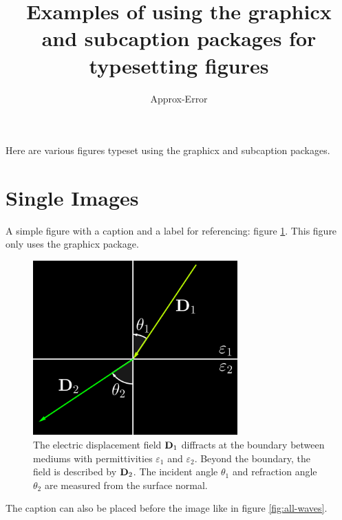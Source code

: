 \documentclass{article}
\title{Examples of using the graphicx and subcaption packages for typesetting figures}
\author{Approx-Error}
\begin{document}
    \normalsize
    \maketitle

    Here are various figures typeset using the graphicx and subcaption packages.

    \section{Single Images}

    A simple figure with a caption and a label for referencing: figure \ref{fig:e2d}. This figure only uses the graphicx package.

    \begin{figure}[h!]
        \centering
        \includegraphics[width=0.7\textwidth]{misc/e-2d.png}
        \caption{The electric displacement field $\mathbf{D}_{1}$ diffracts at the boundary between mediums with permittivities $\varepsilon_{1}$ and $\varepsilon_{2}$.
        Beyond the boundary, the field is described by $\mathbf{D}_{2}$. The incident angle $\theta_{1}$ and refraction angle $\theta_{2}$ are measured from the surface normal.}
        \label{fig:e2d}
    \end{figure}

    \pagebreak

    The caption can also be placed before the image like in figure \ref{fig:all-waves}.
\end{document}
